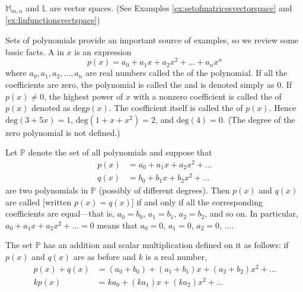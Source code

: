 \documentclass{ximera}
\begin{document}
\begin{example}\label{ex:MLexamplesofvectspaces}
$\mathbb{M}_{m,n}$ and $\mathbb{L}$ are vector spaces. (See Examples \ref{ex:setofmatricesvectorspace} and \ref{ex:linfunctionsvectspace})
\end{example}
Sets of polynomials provide an important source of examples, so we review some basic facts. A  in $x$ is an expression
\begin{equation*}
p(x) = a_0 + a_1x + a_2x^2 + \ldots + a_nx^n
\end{equation*}
where $a_{0}, a_{1}, a_{2}, \ldots, a_{n}$ are real numbers called the  of the polynomial. If all the coefficients are zero, the polynomial is called the  and is denoted simply as $0$. If $p(x) \neq 0$, the highest power of $x$ with a nonzero coefficient is called the  of $p(x)$ denoted as $\mbox{deg} p(x)$. The coefficient itself is called the  of $p(x)$. Hence $\mbox{deg}(3 + 5x) = 1$, $\mbox{deg}(1 + x + x^{2}) = 2$, and $\mbox{deg}(4) = 0$. (The degree of the zero polynomial is not defined.)

Let $\mathbb{P}$ denote the set of all polynomials and suppose that
\begin{align*}
p(x) &= a_0 + a_1x + a_2x^2 + \ldots \\
q(x) &= b_0 + b_1x + b_2x^2 + \ldots
\end{align*}
are two polynomials in $\mathbb{P}$ (possibly of different degrees). Then $p(x)$ and $q(x)$ are called  [written $p(x) = q(x)$] if and only if all the corresponding coefficients are equal---that is, $a_{0} = b_{0}$, $a_{1} = b_{1}$, $a_{2} = b_{2}$, and so on. In particular, $a_{0} + a_{1}x + a_{2}x^{2} + \ldots = 0$ means that $a_{0} = 0$, $a_{1} = 0$, $a_{2} = 0$, $\ldots$. 

The set $\mathbb{P}$ has an addition and scalar multiplication defined on it as follows: if $p(x)$ and $q(x)$ are as before and $k$ is a real number,
\begin{align*}
p(x) + q(x) &= (a_0 + b_0) + (a_1 + b_1)x + (a_2 + b_2)x^2 + \ldots \\
kp(x) &= ka_0 + (ka_1)x + (ka_2)x^2 + \ldots
\end{align*} 
\end{document}

